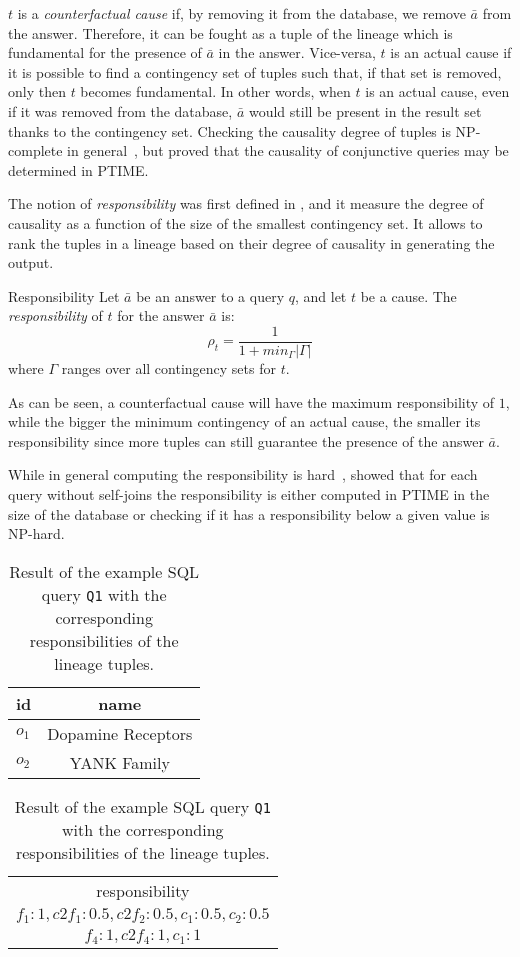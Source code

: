 $t$ is a \emph{counterfactual cause} if, by removing it from the database, we remove $\bar{a}$ from the answer. Therefore, it can be fought as a tuple of the lineage which is fundamental for the presence of $\bar{a}$ in the answer.
Vice-versa, $t$ is an actual cause if it is possible to find a contingency set of tuples such that, if that set is removed, only then $t$ becomes fundamental. In other words, when $t$ is an actual cause, even if it was removed from the database, $\bar{a}$ would still be present in the result set thanks to the contingency set. 
Checking the causality degree of tuples is NP-complete in general~\cite{EiterL02}, but \citet{MeliouGMS11} proved that the causality of conjunctive queries may be determined in PTIME.


The notion of \emph{responsibility} was first defined in \cite{ChocklerH04}, and it measure the degree of causality as a function of the size of the smallest contingency set. It allows to rank the tuples in a lineage based on their degree of causality in generating the output. 

\begin{definition}{Responsibility \cite{MeliouGMS11}}
	Let $\bar{a}$ be an answer to a query $q$, and let $t$ be a cause. The \emph{responsibility} of $t$ for the answer $\bar{a}$ is:
	\[
		\rho_t = \frac{1}{1 + min_\Gamma|\Gamma|}
	\]
	where $\Gamma$ ranges over all contingency sets for $t$.
\end{definition}

As can be seen, a counterfactual cause will have the maximum responsibility of $1$, while the bigger the minimum contingency of an actual cause, the smaller its responsibility since more tuples can still guarantee the presence of the answer $\bar{a}$.

While in general computing the responsibility is hard~\cite{ChocklerH04}, \citet{MeliouGMS11} showed that for each query without self-joins the responsibility is either computed in PTIME in the size of the database or checking if it has a responsibility below a given value is NP-hard. 

\begin{table}[]
\centering
  \begin{tabular}{|l|c|}
  \hline
    id & name\\
    \hline
    $o_1$ &  Dopamine Receptors\\
    $o_2$ & YANK Family\\
    \hline
  \end{tabular}
  \begin{tabular}{c}
  	responsibility   \\
  	$f_1: 1, c2f_1: 0.5, c2f_2: 0.5, c_1: 0.5, c_2: 0.5$ \\
  	$f_4: 1, c2f_4: 1, c_1: 1$ \\
  \end{tabular}
    \caption{Result of the example SQL query \texttt{Q1} with the corresponding responsibilities of the lineage tuples.}
  \label{table:result_responsibility}
\end{table} 

